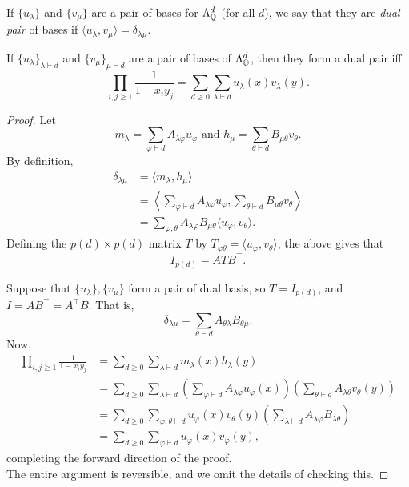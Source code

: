 	\begin{fdef}
		If $\{u_\lambda\}$ and $\{v_\mu\}$ are a pair of bases for $\Lambda_{\mathbb{Q}}^d$ (for all $d$), we say that they are \emph{dual pair} of bases if $\langle u_\lambda , v_\mu \rangle = \delta_{\lambda\mu}$.
	\end{fdef}

	\begin{ftheo}
		\label{theo: characterize dual basis}
		If $\{u_\lambda\}_{\lambda \vdash d}$ and $\{v_\mu\}_{\mu \vdash d}$ are a pair of bases of $\Lambda_{\mathbb{Q}}^d$, then they form a dual pair iff
		\[ \prod_{i,j \ge 1} \frac{1}{1-x_iy_j} = \sum_{d \ge 0} \sum_{\lambda \vdash d} u_\lambda(x) v_\lambda(y). \]
	\end{ftheo}
	\begin{proof}
		Let
		\[ m_\lambda = \sum_{\varphi \vdash d} A_{\lambda\varphi} u_\varphi \text{ and } h_\mu = \sum_{\theta \vdash d} B_{\mu\theta} v_\theta. \]
		By definition,
		\begin{align*}
			\delta_{\lambda\mu} &= \langle m_\lambda , h_\mu \rangle \\
				&= \left\langle \sum_{\varphi \vdash d} A_{\lambda\varphi} u_\varphi , \sum_{\theta \vdash d} B_{\mu\theta} v_\theta \right\rangle \\
				&= \sum_{\varphi,\theta} A_{\lambda\varphi} B_{\mu\theta} \langle u_\varphi , v_\theta \rangle.
		\end{align*}
		Defining the $p(d) \times p(d)$ matrix $T$ by $T_{\varphi\theta} = \langle u_\varphi , v_\theta \rangle$, the above gives that
		\[ I_{p(d)} = A T B^\top. \]

		Suppose that $\{u_\lambda\},\{v_\mu\}$ form a pair of dual basis, so $T = I_{p(d)}$, and $I = AB^\top  = A^\top B$. That is,
		\[ \delta_{\lambda\mu} = \sum_{\theta \vdash d} A_{\theta\lambda} B_{\theta\mu}. \]
		Now,
		\begin{align*}
			\prod_{i,j \ge 1} \frac{1}{1-x_iy_j} &= \sum_{d \ge 0} \sum_{\lambda \vdash d} m_\lambda(x) h_\lambda(y) \\
				&= \sum_{d \ge 0} \sum_{\lambda \vdash d} \left( \sum_{\varphi \vdash d} A_{\lambda\varphi} u_\varphi(x) \right) \left( \sum_{\theta \vdash d} A_{\lambda\theta} v_\theta(y) \right) \\
				&= \sum_{d \ge 0} \sum_{\varphi,\theta \vdash d} u_\varphi(x) v_\theta(y) \left( \sum_{\lambda \vdash d} A_{\lambda\varphi} B_{\lambda\theta} \right) \\
				&= \sum_{d \ge 0} \sum_{\varphi \vdash d} u_\varphi(x) v_\varphi(y),
		\end{align*}
		completing the forward direction of the proof.\\
		The entire argument is reversible, and we omit the details of checking this.
	\end{proof}

